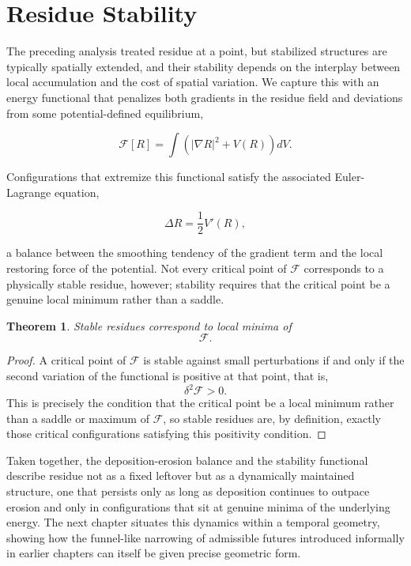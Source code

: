 \documentclass[11pt,oneside]{book}
\theoremstyle{plain}
\newtheorem{theorem}{Theorem}[chapter]
\theoremstyle{definition}
\theoremstyle{remark}
\begin{document}
\section{Residue Stability}

The preceding analysis treated residue at a point, but stabilized structures are typically spatially extended, and their stability depends on the interplay between local accumulation and the cost of spatial variation. We capture this with an energy functional that penalizes both gradients in the residue field and deviations from some potential-defined equilibrium,

\[
\mathcal F[R]
=
\int
\left(
|\nabla R|^2
+
V(R)
\right)dV.
\]

Configurations that extremize this functional satisfy the associated Euler-Lagrange equation,

\[
\Delta R
=
\frac12V'(R),
\]

a balance between the smoothing tendency of the gradient term and the local restoring force of the potential. Not every critical point of \(\mathcal F\) corresponds to a physically stable residue, however; stability requires that the critical point be a genuine local minimum rather than a saddle.

\begin{theorem}
Stable residues correspond to local minima of
\[
\mathcal F.
\]
\end{theorem}

\begin{proof}
A critical point of \(\mathcal F\) is stable against small perturbations if and only if the second variation of the functional is positive at that point, that is,
\[
\delta^2\mathcal F>0.
\]
This is precisely the condition that the critical point be a local minimum rather than a saddle or maximum of \(\mathcal F\), so stable residues are, by definition, exactly those critical configurations satisfying this positivity condition.
\end{proof}

Taken together, the deposition-erosion balance and the stability functional describe residue not as a fixed leftover but as a dynamically maintained structure, one that persists only as long as deposition continues to outpace erosion and only in configurations that sit at genuine minima of the underlying energy. The next chapter situates this dynamics within a temporal geometry, showing how the funnel-like narrowing of admissible futures introduced informally in earlier chapters can itself be given precise geometric form.
\end{document}
